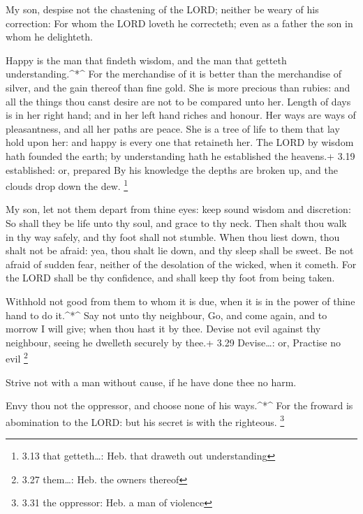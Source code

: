  My son, despise not the chastening of the LORD; neither be
weary of his correction:  For whom the LORD loveth he
correcteth; even as a father the son in whom he delighteth.

 Happy is the man that findeth wisdom, and the man that
getteth understanding.\^{}*\^{}  For the merchandise of it
is better than the merchandise of silver, and the gain thereof than fine
gold.  She is more precious than rubies: and all the things
thou canst desire are not to be compared unto her.  Length
of days is in her right hand; and in her left hand riches and honour.
 Her ways are ways of pleasantness, and all her paths are
peace.  She is a tree of life to them that lay hold upon
her: and happy is every one that retaineth her.  The LORD
by wisdom hath founded the earth; by understanding hath he established
the heavens.+ 3.19 established: or, prepared  By his
knowledge the depths are broken up, and the clouds drop down the dew.
\footnote{3.13 that getteth\ldots: Heb. that draweth out understanding}

 My son, let not them depart from thine eyes: keep sound
wisdom and discretion:  So shall they be life unto thy
soul, and grace to thy neck.  Then shalt thou walk in thy
way safely, and thy foot shall not stumble.  When thou
liest down, thou shalt not be afraid: yea, thou shalt lie down, and thy
sleep shall be sweet.  Be not afraid of sudden fear,
neither of the desolation of the wicked, when it cometh. 
For the LORD shall be thy confidence, and shall keep thy foot from being
taken.

 Withhold not good from them to whom it is due, when it is
in the power of thine hand to do it.\^{}*\^{}  Say not unto
thy neighbour, Go, and come again, and to morrow I will give; when thou
hast it by thee.  Devise not evil against thy neighbour,
seeing he dwelleth securely by thee.+ 3.29 Devise\ldots: or, Practise no
evil \footnote{3.27 them\ldots: Heb. the owners thereof}

 Strive not with a man without cause, if he have done thee
no harm.

 Envy thou not the oppressor, and choose none of his
ways.\^{}*\^{}  For the froward is abomination to the LORD:
but his secret is with the righteous. \footnote{3.31 the oppressor: Heb.
  a man of violence}


